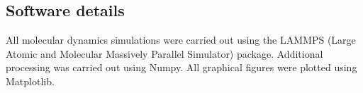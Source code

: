 \subsection{Software details}
All molecular dynamics simulations were carried out using the LAMMPS (Large Atomic and Molecular Massively Parallel Simulator) package.\cite{LAMMPS}
Additional processing was carried out using Numpy.\cite{NumPy}
All graphical figures were plotted using Matplotlib.\cite{MatPlotLib}

